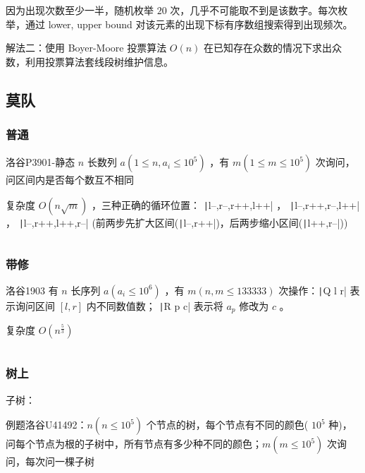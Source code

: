 \documentclass[twocolumn,10pt]{ctexart}
\begin{document}
因为出现次数至少一半，随机枚举 $20$ 次，几乎不可能取不到是该数字。每次枚举，通过 lower, upper bound 对该元素的出现下标有序数组搜索得到出现频次。

\begin{notebox}
解法二：使用 Boyer-Moore 投票算法 $O(n)$ 在已知存在众数的情况下求出众数，利用投票算法套线段树维护信息。
\end{notebox}

\subsection{莫队}

\subsubsection{普通}

\begin{notebox}
洛谷P3901-静态 $n$ 长数列 $a(1\le n,a_i\le10^5)$ ，有 $m(1\le m\le10^5)$ 次询问，问区间内是否每个数互不相同
\end{notebox}

复杂度 $O(n\sqrt m)$ ，三种正确的循环位置： \texttt|l--,r--,r++,l++|  ， \texttt|l--,r++,r--,l++| ， \texttt|l--,r++,l++,r--| (前两步先扩大区间(\texttt|l--,r++|)，后两步缩小区间(\texttt|l++,r--|))

\inputminted{cpp}{code/p3901_mo_algo.cpp}

\subsubsection{带修}

\begin{notebox}
洛谷1903 有 $n$ 长序列 $a(a_i\le10^6)$ ，有 $m(n,m\le 133333)$ 次操作：\texttt|Q l r| 表示询问区间 $[l,r]$ 内不同数值数； \texttt|R p c| 表示将 $a_p$ 修改为 $c$ 。
\end{notebox}

复杂度 $O(n^\frac53)$

\inputminted{cpp}{code/p1903_mo_algo.cpp}

\subsubsection{树上}

子树：

\begin{notebox}
例题洛谷U41492：$n(n\le 10^5)$ 个节点的树，每个节点有不同的颜色( $10^5$ 种)，问每个节点为根的子树中，所有节点有多少种不同的颜色；$m(m\le 10^5)$ 次询问，每次问一棵子树
\end{notebox}
\end{document}
